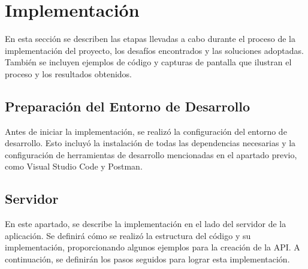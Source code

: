 \chapter{Implementación}

En esta sección se describen las etapas llevadas a cabo durante el proceso de la implementación del proyecto, los desafíos encontrados y las soluciones adoptadas. También se incluyen ejemplos de código y capturas de pantalla que ilustran el proceso y los resultados obtenidos.

\section{Preparación del Entorno de Desarrollo}

Antes de iniciar la implementación, se realizó la configuración del entorno de desarrollo. Esto incluyó la instalación de todas las dependencias necesarias y la configuración de herramientas de desarrollo mencionadas en el apartado previo, como Visual Studio Code y Postman.


\section{Servidor}

En este apartado, se describe la implementación en el lado del servidor de la aplicación. Se definirá cómo se realizó la estructura del código y su implementación, proporcionando algunos ejemplos para la creación de la API. A continuación, se definirán los pasos seguidos para lograr esta implementación.

